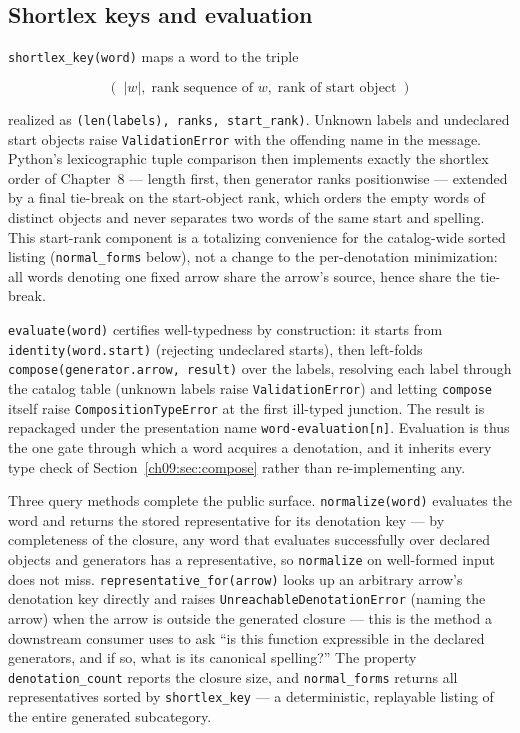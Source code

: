 \subsection{Shortlex keys and evaluation}

\texttt{shortlex\_key(word)} maps a word to the triple

\[
(\;|w|,\; \text{rank sequence of } w,\; \text{rank of start object}\;)
\]

realized as \texttt{(len(labels), ranks, start\_rank)}. Unknown labels and
undeclared start objects raise \texttt{ValidationError} with the offending
name in the message. Python's lexicographic tuple comparison then
implements exactly the shortlex order of Chapter~8 --- length first, then
generator ranks positionwise --- extended by a final tie-break on the
start-object rank, which orders the empty words of distinct objects and
never separates two words of the same start and spelling. This start-rank
component is a totalizing convenience for the catalog-wide sorted listing
(\texttt{normal\_forms} below), not a change to the per-denotation
minimization: all words denoting one fixed arrow share the arrow's source,
hence share the tie-break.

\texttt{evaluate(word)} certifies well-typedness by construction: it
starts from \texttt{identity(word.start)} (rejecting undeclared starts),
then left-folds \texttt{compose(generator.arrow, result)} over the labels,
resolving each label through the catalog table (unknown labels raise
\texttt{ValidationError}) and letting \texttt{compose} itself raise
\texttt{CompositionTypeError} at the first ill-typed junction. The result
is repackaged under the presentation name
\texttt{word-evaluation[n]}. Evaluation is thus the one gate through which
a word acquires a denotation, and it inherits every type check of
Section~\ref{ch09:sec:compose} rather than re-implementing any.

Three query methods complete the public surface.
\texttt{normalize(word)} evaluates the word and returns the stored
representative for its denotation key --- by completeness of the closure,
any word that evaluates successfully over declared objects and generators
has a representative, so \texttt{normalize} on well-formed input does not
miss. \texttt{representative\_for(arrow)} looks up an arbitrary arrow's
denotation key directly and raises \texttt{UnreachableDenotationError}
(naming the arrow) when the arrow is outside the generated closure ---
this is the method a downstream consumer uses to ask ``is this function
expressible in the declared generators, and if so, what is its canonical
spelling?'' The property \texttt{denotation\_count} reports the closure
size, and \texttt{normal\_forms} returns all representatives sorted by
\texttt{shortlex\_key} --- a deterministic, replayable listing of the
entire generated subcategory.

